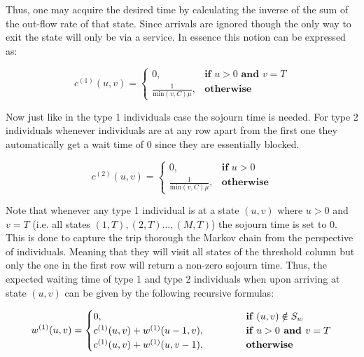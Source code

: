 Thus, one may acquire the desired time by calculating the inverse of the sum of 
the out-flow rate of that state. 
Since arrivals are ignored though the only way to exit the state will only be 
via a service. 
In essence this notion can be expressed as:

\begin{equation} \label{eq:sojourn_type_1}
    c^{(1)}(u,v) = 
    \begin{cases}
        0, & \textbf{if } u > 0 \textbf{ and } v = T \\
        \frac{1}{\text{min}(v,C)\mu}, & \textbf{otherwise}
    \end{cases}
\end{equation}

Now just like in the type 1 individuals case the sojourn time is needed. 
For type 2 individuals whenever individuals are at any row apart from the 
first one they automatically get a wait time of \(0\) since they are essentially 
blocked.

\begin{equation} \label{eq:sojourn_type_2}
    c^{(2)}(u,v) = 
    \begin{cases}
        0, & \textbf{if } u > 0 \\
        \frac{1}{\text{min}(v,C)\mu}, & \textbf{otherwise}
    \end{cases}
\end{equation}

Note that whenever any type 1 individual is at a state \((u,v)\) where 
\(u > 0\) 
and \(v = T\) (i.e. all states \((1,T), (2,T) \dots, (M,T)\)) the sojourn time is 
set to \(0\). 
This is done to capture the trip thorough the Markov chain from the perspective 
of individuals. 
Meaning that they will visit all states of the threshold column but only the one 
in the first row will return a non-zero sojourn time.
Thus, the expected waiting time of type 1 and type 2 individuals when upon
arriving at state \( (u,v) \) can be given by the following recursive formulas:

\begin{equation} \label{eq:waiting-time-at-each-state-type-1}
    w^{(1)}(u,v) = 
    \begin{cases} 
        0, \hspace{4.85cm} & \textbf{if } (u,v) \notin S_w \\
        c^{(1)}(u,v) + w^{(1)}(u-1, v), & \textbf{if } u > 0 \textbf{ and } v = T \\
        c^{(1)}(u,v) + w^{(1)}(u, v-1), & \textbf{otherwise}
    \end{cases}
\end{equation}

